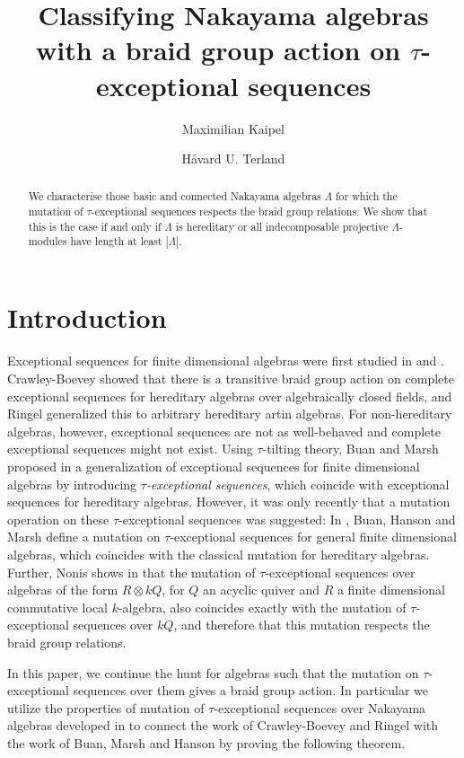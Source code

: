 \documentclass[11pt]{amsart}
\title{}
\title[A braid group action on $\tau$-exceptional sequences]{Classifying Nakayama algebras with a braid group action on $\tau$-exceptional sequences}
\author{Maximilian Kaipel}
\author{Håvard U. Terland}
\theoremstyle{definition}
\begin{document}
\begin{abstract}
We characterise those basic and connected Nakayama algebras $\Lambda$ for which the mutation of $\tau$-exceptional sequences respects the braid group relations. We show that this is the case if and only if $\Lambda$ is hereditary or all indecomposable projective $\Lambda$-modules have length at least $|\Lambda|$.
	\end{abstract}

\maketitle


\section{Introduction}
Exceptional sequences for finite dimensional algebras were first studied in \cite{cbw92} and \cite{ringel_exceptional}. Crawley-Boevey showed that there is a transitive braid group action on complete exceptional sequences for hereditary algebras over algebraically closed fields, and Ringel generalized this to arbitrary hereditary artin algebras. For non-hereditary algebras, however, exceptional sequences are not as well-behaved and complete exceptional sequences might not exist. Using $\tau$-tilting theory, Buan and Marsh proposed in \cite{tauexceptional_buanmarsh} a generalization of exceptional sequences for finite dimensional algebras by introducing \textit{$\tau$-exceptional sequences}, which coincide with exceptional sequences for hereditary algebras. However, it was only recently that a mutation operation on these $\tau$-exceptional sequences was suggested: In \cite{BHM2024}, Buan, Hanson and Marsh define a mutation on $\tau$-exceptional sequences for general finite dimensional algebras, which coincides with the classical mutation for hereditary algebras. Further, Nonis shows in \cite{nonis2025} that the mutation  of $\tau$-exceptional sequences over algebras of the form $R \otimes kQ$, for $Q$ an acyclic quiver and $R$ a finite dimensional commutative local $k$-algebra, also coincides exactly with the mutation of $\tau$-exceptional sequences over $kQ$, and therefore that this mutation respects the braid group relations.

In this paper, we continue the hunt for algebras such that the mutation on $\tau$-exceptional sequences over them gives a braid group action. In particular we utilize the properties of mutation of $\tau$-exceptional sequences over Nakayama algebras developed in \cite{bkt} to connect the work of Crawley-Boevey \cite{cbw92} and Ringel \cite{ringel_exceptional} with the work of Buan, Marsh and Hanson \cite{BHM2024} by proving the following theorem.
\end{document}

